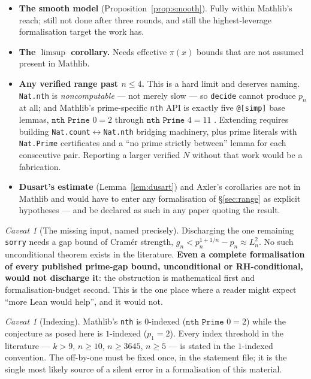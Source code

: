 \documentclass[11pt,a4paper]{article}
\theoremstyle{plain}
\theoremstyle{definition}
\theoremstyle{remark}
\newtheorem{hazard}[theorem]{Caveat}
\begin{document}
\begin{itemize}
\item \textbf{The smooth model} (Proposition~\ref{prop:smooth}). Fully within Mathlib's
  reach; still not done after three rounds, and still the highest-leverage formalisation target
  the work has.
\item \textbf{The $\limsup$ corollary.} Needs effective $\pi(x)$ bounds that are not assumed
  present in Mathlib.
\item \textbf{Any verified range past $n \le 4$.} This is a hard limit and deserves naming.
  \texttt{Nat.nth} is \emph{noncomputable} \cite{mathlibNatNth} --- not merely slow --- so
  \texttt{decide} cannot produce $p_n$ at all; and Mathlib's prime-specific \texttt{nth} API
  is exactly five \texttt{@[simp]} base lemmas, $\texttt{nth Prime } 0 = 2$ through
  $\texttt{nth Prime } 4 = 11$ \cite{mathlibNatPrimeNth}. Extending requires building
  \texttt{Nat.count}$\leftrightarrow$\texttt{Nat.nth} bridging machinery, plus prime literals
  with \texttt{Nat.Prime} certificates and a ``no prime strictly between'' lemma for each
  consecutive pair. Reporting a larger verified $N$ without that work would be a fabrication.
\item \textbf{Dusart's estimate} (Lemma~\ref{lem:dusart}) and Axler's corollaries are not in
  Mathlib and would have to enter any formalisation of \S\ref{sec:range} as explicit
  hypotheses --- and be declared as such in any paper quoting the result.
\end{itemize}

\begin{hazard}[The missing input, named precisely]
\label{haz:missing}
Discharging the one remaining \texttt{sorry} needs a gap bound of Cram\'er strength,
$g_n < p_n^{1+1/n} - p_n \approx L_n^2$. No such unconditional theorem exists in the
literature. \textbf{Even a complete formalisation of every published prime-gap bound,
unconditional or RH-conditional, would not discharge it}: the obstruction is mathematical
first and formalisation-budget second. This is the one place where a reader might expect
``more Lean would help'', and it would not.
\end{hazard}

\begin{hazard}[Indexing]
Mathlib's \texttt{nth} is $0$-indexed ($\texttt{nth Prime } 0 = 2$) while the conjecture as
posed here is $1$-indexed ($p_1 = 2$). Every index threshold in the literature --- $k > 9$,
$n \ge 10$, $n \ge 3645$, $n \ge 5$ --- is stated in the $1$-indexed convention. The
off-by-one must be fixed once, in the statement file; it is the single most likely source of a
silent error in a formalisation of this material.
\end{hazard}
\end{document}
